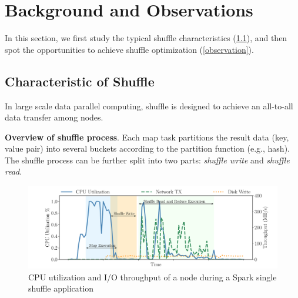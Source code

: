 \section{Background and Observations}

In this section, we first study the typical shuffle characteristics (\ref{shuffle pattern}), and then spot the opportunities to achieve shuffle optimization (\ref{observation}).
\subsection{Characteristic of Shuffle} \label{shuffle pattern}

In large scale data parallel computing, shuffle is designed to achieve an all-to-all data transfer among nodes. 

\textbf{Overview of shuffle process}. 
Each map task partitions the result data (key, value pair) into several buckets according to the partition function (e.g., hash). 
The shuffle process can be further split into two parts: \textit{shuffle write} and \textit{shuffle read}. 

\begin{figure}
	\includegraphics[width=\linewidth]{fig/util}
	\caption{CPU utilization and I/O throughput of a node during a Spark single shuffle application}
	\label{fig:util}
	\vspace{-1em}
\end{figure}


